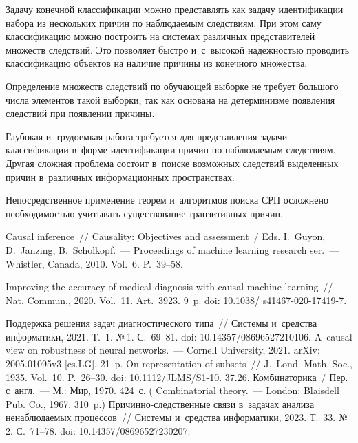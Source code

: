 \begin{multicols}{2}
  Задачу конечной классификации можно пред\-став\-лять как задачу 
идентификации набора из нескольких причин по наблюда\-емым следствиям. При 
этом саму классификацию мож\-но по\-стро\-ить на сис\-те\-мах различных 
пред\-ста\-ви\-те\-лей множеств следствий. Это позволяет быст\-ро и~с~высокой 
на\-деж\-ностью проводить классификацию объектов на наличие причины из 
конечного множества.
  
  Определение множеств следствий по обуча\-ющей выборке не требует большого 
чис\-ла элементов такой выборки, так как основана на детерминизме появления 
следствий при появлении \mbox{при\-чины}.
   
  Глубокая и~трудоемкая работа требуется для пред\-став\-ле\-ния задачи 
классификации в~форме идентификации причин по наблюдаемым следствиям. 
Другая слож\-ная проб\-ле\-ма со\-сто\-ит в~поиске возможных следствий выделенных 
причин в~различных информационных пространствах.
  
   Непосредственное применение тео\-рем и~алгоритмов поиска СРП ослож\-не\-но 
не\-об\-хо\-ди\-мостью учитывать существование транзитивных причин.

\vspace*{-3pt}
  
{\small\frenchspacing
 { %
 \begin{thebibliography}{9}

 Causal inference~// Causality: Objectives and assessment~/ Eds. I.~Guyon, D.~Janzing, B.~Scholkopf.~--- Proceedings of machine learning research 
ser.~--- Whistler, Canada, 2010. Vol.~6. P.~39--58.

 Improving the accuracy of medical diagnosis with causal 
machine learning~// Nat. Commun., 2020. Vol.~11. Art.~3923. 9~p.  
doi: 10.1038/ s41467-020-17419-7.

 Под\-держ\-ка решения задач 
диагностического типа~// Сис\-те\-мы и~средства информатики, 2021. Т.~1. №\,1. С.~69--81. doi: 
10.14357/08696527210106.
 A~causal view on robustness of neural networks.~--- Cornell 
University, 2021. \mbox{arXiv}: 2005.01095v3 [cs.LG]. 21~p.
 On representation of subsets~// J.~Lond. Math. Soc., 1935. Vol.~10. P.~26--30.
doi: 10.1112/JLMS/S1-10. 37.26.
 Комбинаторика~/ Пер. с~англ.~--- М.: Мир, 1970. 424~с.
( {Combinatorial theory}.~--- London: Blaisdell Pub. Co., 1967. 310~p.)
 При\-чин\-но-след\-ст\-вен\-ные связи в~задачах анализа ненаблюдаемых 
процессов~// Сис\-те\-мы и~средства информатики, 2023. Т.~33. №\,2. С.~71--78.
doi: 10.14357/08696527230207.
\end{thebibliography}

 }
 }

\end{multicols}

